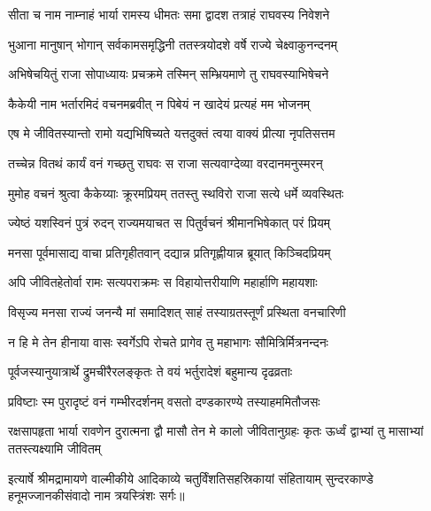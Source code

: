\twolineshloka
{सीता च नाम नाम्नाहं भार्या रामस्य धीमतः}
{समा द्वादश तत्राहं राघवस्य निवेशने}

\twolineshloka
{भुआना मानुषान् भोगान् सर्वकामसमृद्धिनी}
{ततस्त्रयोदशे वर्षे राज्ये चेक्ष्वाकुनन्दनम्}

\twolineshloka
{अभिषेचयितुं राजा सोपाध्यायः प्रचक्रमे}
{तस्मिन् सम्भ्रियमाणे तु राघवस्याभिषेचने}

\twolineshloka
{कैकेयी नाम भर्तारमिदं वचनमब्रवीत्}
{न पिबेयं न खादेयं प्रत्यहं मम भोजनम्}

\twolineshloka
{एष मे जीवितस्यान्तो रामो यद्यभिषिच्यते}
{यत्तदुक्तं त्वया वाक्यं प्रीत्या नृपतिसत्तम}

\twolineshloka
{तच्चेन्न वितथं कार्यं वनं गच्छतु राघवः}
{स राजा सत्यवाग्देव्या वरदानमनुस्मरन्}

\twolineshloka
{मुमोह वचनं श्रुत्वा कैकेय्याः क्रूरमप्रियम्}
{ततस्तु स्थविरो राजा सत्ये धर्मे व्यवस्थितः}

\twolineshloka
{ज्येष्ठं यशस्विनं पुत्रं रुदन् राज्यमयाचत}
{स पितुर्वचनं श्रीमानभिषेकात् परं प्रियम्}

\twolineshloka
{मनसा पूर्वमासाद्य वाचा प्रतिगृहीतवान्}
{दद्यान्न प्रतिगृह्णीयान्न ब्रूयात् किञ्चिदप्रियम्}

\twolineshloka
{अपि जीवितहेतोर्वा रामः सत्यपराक्रमः}
{स विहायोत्तरीयाणि महार्हाणि महायशाः}

\twolineshloka
{विसृज्य मनसा राज्यं जनन्यै मां समादिशत्}
{साहं तस्याग्रतस्तूर्णं प्रस्थिता वनचारिणी}

\twolineshloka
{न हि मे तेन हीनाया वासः स्वर्गेऽपि रोचते}
{प्रागेव तु महाभागः सौमित्रिर्मित्रनन्दनः}

\twolineshloka
{पूर्वजस्यानुयात्रार्थे द्रुमचीरैरलङ्कृतः}
{ते वयं भर्तुरादेशं बहुमान्य दृढव्रताः}

\twolineshloka
{प्रविष्टाः स्म पुरादृष्टं वनं गम्भीरदर्शनम्}
{वसतो दण्डकारण्ये तस्याहममितौजसः}

\threelineshloka
{रक्षसापहृता भार्या रावणेन दुरात्मना}
{द्वौ मासौ तेन मे कालो जीवितानुग्रहः कृतः}
{ऊर्ध्वं द्वाभ्यां तु मासाभ्यां ततस्त्यक्ष्यामि जीवितम्}

इत्यार्षे श्रीमद्रामायणे वाल्मीकीये आदिकाव्ये चतुर्विंशतिसहस्रिकायां संहितायाम्
सुन्दरकाण्डे हनूमज्जानकीसंवादो नाम त्रयस्त्रिंशः सर्गः॥

\closesection